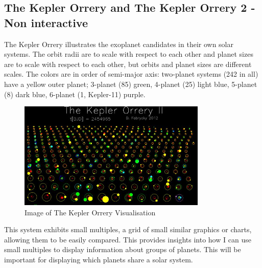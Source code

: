 \subsection{The Kepler Orrery and The Kepler Orrery 2 - Non interactive}
The Kepler Orrery \cite{orrery} illustrates the exoplanet candidates in their own solar systems. The orbit radii are to scale with respect to each other and planet sizes are to scale with respect to each other, but orbits and planet sizes are different scales. The colors are in order of semi-major axis: two-planet systems (242 in all) have a yellow outer planet; 3-planet (85) green, 4-planet (25) light blue, 5-planet (8) dark blue, 6-planet (1, Kepler-11) purple. 
\begin{figure}[h!]
  \centering
      \includegraphics[width=0.8\textwidth]{images/orrery.jpg}
  \caption{Image of The Kepler Orrery Visualisation}
\end{figure}
This system exhibits small multiples, a grid of small similar graphics or charts, allowing them to be easily compared. This provides insights into how I can use small multiples to display information about groups of planets. This will be important for displaying which planets share a solar system.

